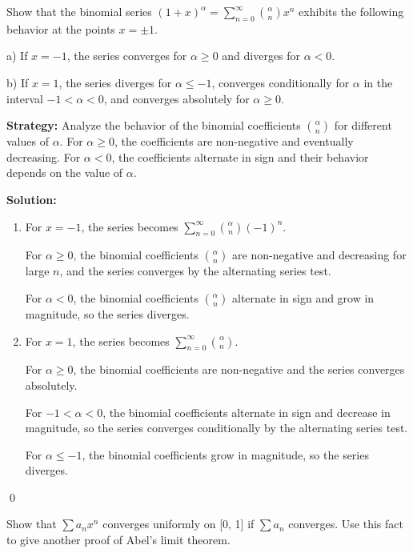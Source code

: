 \begin{problembox}
Show that the binomial series \( (1 + x)^\alpha = \sum_{n=0}^\infty \binom{\alpha}{n} x^n \) exhibits the following behavior at the points \( x = \pm 1 \).

a) If \( x = -1 \), the series converges for \( \alpha \geq 0 \) and diverges for \( \alpha < 0 \).

b) If \( x = 1 \), the series diverges for \( \alpha \leq -1 \), converges conditionally for \( \alpha \) in the interval \(-1 < \alpha < 0 \), and converges absolutely for \( \alpha \geq 0 \).
\end{problembox}

\noindent\textbf{Strategy:} Analyze the behavior of the binomial coefficients \( \binom{\alpha}{n} \) for different values of \( \alpha \). For \( \alpha \geq 0 \), the coefficients are non-negative and eventually decreasing. For \( \alpha < 0 \), the coefficients alternate in sign and their behavior depends on the value of \( \alpha \).

\bigskip\noindent\textbf{Solution:}
\begin{enumerate}[label=(\alph*)]
\item For \( x = -1 \), the series becomes \( \sum_{n=0}^\infty \binom{\alpha}{n} (-1)^n \).

For \( \alpha \geq 0 \), the binomial coefficients \( \binom{\alpha}{n} \) are non-negative and decreasing for large \( n \), and the series converges by the alternating series test.

For \( \alpha < 0 \), the binomial coefficients \( \binom{\alpha}{n} \) alternate in sign and grow in magnitude, so the series diverges.

\item For \( x = 1 \), the series becomes \( \sum_{n=0}^\infty \binom{\alpha}{n} \).

For \( \alpha \geq 0 \), the binomial coefficients are non-negative and the series converges absolutely.

For \( -1 < \alpha < 0 \), the binomial coefficients alternate in sign and decrease in magnitude, so the series converges conditionally by the alternating series test.

For \( \alpha \leq -1 \), the binomial coefficients grow in magnitude, so the series diverges.
\end{enumerate}\qed


\begin{problembox}
Show that \( \sum a_n x^n \) converges uniformly on [0, 1] if \( \sum a_n \) converges. Use this fact to give another proof of Abel's limit theorem.
\end{problembox}

